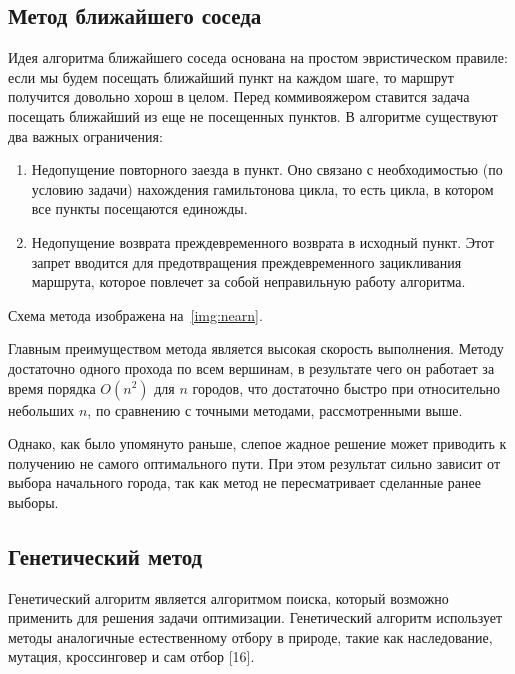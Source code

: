 \subsection{Метод ближайшего соседа}
Идея алгоритма ближайшего соседа основана на простом эвристическом правиле: если мы будем посещать ближайший пункт на каждом шаге, то маршрут получится довольно хорош в целом. Перед коммивояжером ставится задача посещать ближайший из еще не посещенных пунктов. В алгоритме существуют два важных ограничения:
\begin{enumerate}
    \item Недопущение повторного заезда в пункт. Оно связано с
необходимостью (по условию задачи) нахождения гамильтонова цикла, то
есть цикла, в котором все пункты посещаются единожды.
    \item Недопущение возврата преждевременного возврата в исходный
пункт. Этот запрет вводится для предотвращения преждевременного
зацикливания маршрута, которое повлечет за собой неправильную работу
алгоритма.
\end{enumerate}

Схема метода изображена на~\ref{img:nearn}.\clearpage
{}

Главным преимуществом метода является высокая скорость выполнения. Методу достаточно одного прохода по всем вершинам, в результате чего он работает за время порядка $O(n^2)$ для $n$ городов, что достаточно быстро при относительно небольших $n$, по сравнению с точными методами, рассмотренными выше.

Однако, как было упомянуто раньше, слепое жадное решение может приводить к получению не самого оптимального пути. При этом результат сильно зависит от выбора начального города, так как метод не пересматривает сделанные ранее выборы.

\subsection{Генетический метод}
Генетический алгоритм является алгоритмом поиска, который возможно применить для решения задачи оптимизации. Генетический алгоритм использует методы аналогичные естественному отбору в природе, такие как наследование, мутация, кроссинговер и сам отбор [16].

